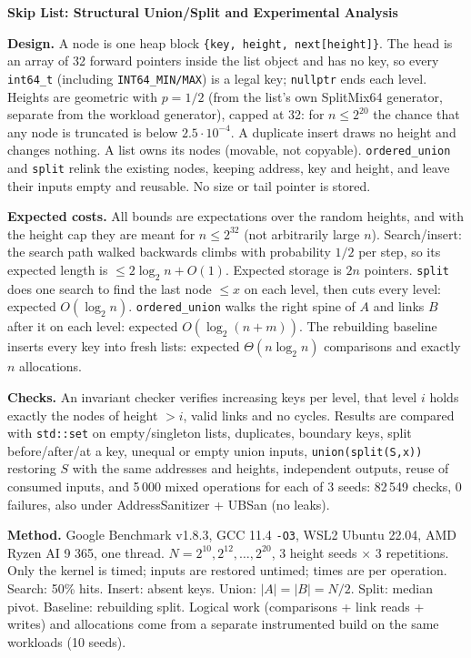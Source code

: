 \documentclass[10pt,a4paper]{article}
\newcommand{\h}[1]{\textbf{#1.}}
\renewcommand{\lg}{\log_2}
\begin{document}
\begin{center}
{\large\bfseries Skip List: Structural Union/Split and Experimental Analysis}
\end{center}
\vspace{-6pt}

\h{Design} A node is one heap block \texttt{\{key, height, next[height]\}}. The head is an array of 32 forward
pointers inside the list object and has no key, so every \texttt{int64\_t} (including \texttt{INT64\_MIN/MAX})
is a legal key; \texttt{nullptr} ends each level. Heights are geometric with $p=1/2$ (from the list's own
SplitMix64 generator, separate from the workload generator), capped at 32: for $n\le 2^{20}$ the chance
that any node is truncated is below $2.5\cdot10^{-4}$. A duplicate insert draws no height and changes nothing.
A list owns its nodes (movable, not copyable). \texttt{ordered\_union} and \texttt{split} relink the existing
nodes, keeping address, key and height, and leave their inputs empty and reusable. No size or tail pointer is stored.

\h{Expected costs} All bounds are expectations over the random heights, and with the height cap they are meant
for $n\le 2^{32}$ (not arbitrarily large $n$). Search/insert: the search path walked backwards climbs with
probability $1/2$ per step, so its expected length is $\le 2\lg n+O(1)$. Expected storage is $2n$ pointers.
\texttt{split} does one search to find the last node $\le x$ on each level, then cuts every level: expected
$O(\lg n)$. \texttt{ordered\_union} walks the right spine of $A$ and links $B$ after it on each level: expected
$O(\lg(n+m))$. The rebuilding baseline inserts every key into fresh lists: expected $\Theta(n\lg n)$ comparisons
and exactly $n$ allocations.

\h{Checks} An invariant checker verifies increasing keys per level, that level $i$ holds exactly the nodes of
height $>i$, valid links and no cycles. Results are compared with \texttt{std::set} on empty/singleton lists,
duplicates, boundary keys, split before/after/at a key, unequal or empty union inputs, \texttt{union(split(S,x))}
restoring $S$ with the same addresses and heights, independent outputs, reuse of consumed inputs, and 5\,000
mixed operations for each of 3 seeds: 82\,549 checks, 0 failures, also under AddressSanitizer + UBSan (no leaks).

\h{Method} Google Benchmark v1.8.3, GCC 11.4 \texttt{-O3}, WSL2 Ubuntu 22.04, AMD Ryzen AI 9 365, one thread.
$N=2^{10},2^{12},\dots,2^{20}$, 3 height seeds $\times$ 3 repetitions. Only the kernel is timed;
inputs are restored untimed; times are per operation. Search: 50\% hits. Insert: absent keys. Union:
$|A|=|B|=N/2$. Split: median pivot. Baseline: rebuilding split. Logical work (comparisons + link reads + writes)
and allocations come from a separate instrumented build on the same workloads (10 seeds).
\end{document}
